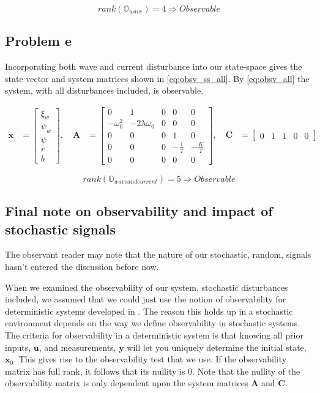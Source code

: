 \begin{equation}\label{eq:obsv_wave}
    rank(\mathbb{O}_{wave}) = 4 \Rightarrow Observable
\end{equation}

\subsection{Problem e}
Incorporating both wave and current disturbance into our state-space gives the state vector and system matrices shown in \cref{eq:obsv_ss_all}. By \cref{eq:obsv_all} the system, with all disturbances included, is observable.

\begin{equation}\label{eq:obsv_ss_all}
\begin{aligned}
\mathbf{x} &= \begin{bmatrix}\xi_w \\ \psi_w \\ \psi \\ r \\ b \end{bmatrix},
\quad \mathbf{A} &= \begin{bmatrix} 0 & 1 & 0 & 0 & 0 \\ -\omega_0^2 & -2\lambda\omega_0 & 0 & 0 & 0\\ 0 & 0 & 0 & 1 & 0 \\ 0 & 0 & 0 & -\frac{1}{T} & -\frac{K}{T} \\ 0 & 0 & 0 & 0 & 0   \end{bmatrix},
\quad \mathbf{C} &= \begin{bmatrix} 0 & 1 & 1 & 0 & 0 \end{bmatrix}
\end{aligned}
\end{equation}

\begin{equation}\label{eq:obsv_all}
    rank(\mathbb{O}_{wave and current}) = 5 \Rightarrow Observable
\end{equation}

\subsection{Final note on observability and impact of stochastic signals}
The observant reader may note that the nature of our stochastic, random, signals hasn't entered the discussion before now.

When we examined the observability of our system, stochastic disturbances included, we assumed that we could just use the notion of observability for deterministic systems developed in \cite{chen}. The reason this holds up in a stochastic environment depends on the way we define observability in stochastic systems. The criteria for observability in a deterministic system is that knowing all prior inputs, $\mathbf{u}$, and measurements, $\mathbf{y}$ will let you uniquely determine the initial state, $\mathbf{x}_0$. This gives rise to the observability test that we use. If the observability matrix has full rank, it follows that its nullity is 0. Note that the nullity of the observability matrix is only dependent upon the system matrices $\mathbf{A}$ and $\mathbf{C}$.

